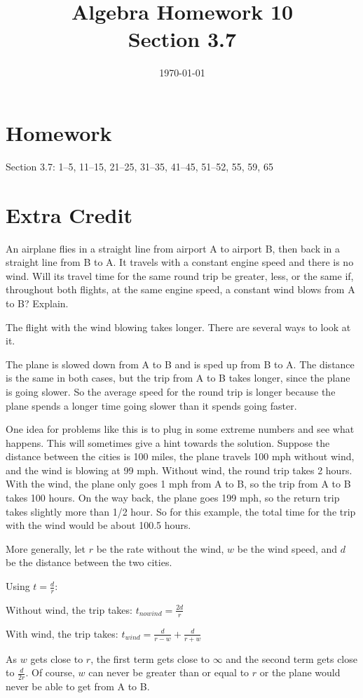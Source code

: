 \documentclass[letterpaper]{exam}
\title{Algebra Homework 10 \\ Section 3.7}
\author{}
\date{\today}
\begin{document}
  \maketitle

  \section{Homework}

  Section 3.7: 1--5, 11--15, 21--25, 31--35, 41--45, 51--52, 55, 59, 65

  \section{Extra Credit}

  An airplane flies in a straight line from airport A to airport B, then back
  in a straight line from B to A.  It travels with a constant engine speed and
  there is no wind.  Will its travel time for the same round trip be greater,
  less, or the same if, throughout both flights, at the same engine speed, a
  constant wind blows from A to B\@?  Explain.

  \begin{solution}
    The flight with the wind blowing takes longer.  There are several ways to
    look at it.

    The plane is slowed down from A to B and is sped up from B to A.  The
    distance is the same in both cases, but the trip from A to B takes longer,
    since the plane is going slower.  So the average speed for the round trip
    is longer because the plane spends a longer time going slower than it
    spends going faster.

    One idea for problems like this is to plug in some extreme numbers and see
    what happens.  This will sometimes give a hint towards the solution.
    Suppose the distance between the cities is 100 miles, the plane travels 100
    mph without wind, and the wind is blowing at 99 mph.  Without wind, the
    round trip takes 2 hours.  With the wind, the plane only goes 1 mph from A
    to B, so the trip from A to B takes 100 hours.  On the way back, the plane
    goes 199 mph, so the return trip takes slightly more than 1/2 hour.  So for
    this example, the total time for the trip with the wind would be about
    100.5 hours.

    More generally, let $r$ be the rate without the wind, $w$ be the wind
    speed, and $d$ be the distance between the two cities.  

    Using $t = \frac{d}{r}$:
    \begin{itemize*}
    \item Without wind, the trip takes: $t_{no wind} = \frac{2d}{r}$
    \item With wind, the trip takes: $t_{wind} = \frac{d}{r - w} + \frac{d}{r + w}$
    \end{itemize*}

    As $w$ gets close to $r$, the first term gets close to $\infty$ and the
    second term gets close to $\frac{d}{2r}$.  Of course, $w$ can never be
    greater than or equal to $r$ or the plane would never be able to get from A
    to B.

  \end{solution}
\end{document}

